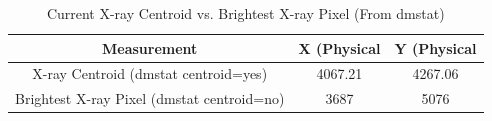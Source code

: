 \documentclass[a4paper,12pt]{article}
\begin{document}
\begin{table}[h]
    \centering
    \caption{Current X-ray Centroid vs. Brightest X-ray Pixel (From dmstat)}
    \begin{tabular}{|c|c|c|}
        \toprule
         \textbf{Measurement} & \textbf{X (Physical} & \textbf{Y (Physical}\\
         \midrule
         X-ray Centroid (dmstat centroid=yes) & 4067.21 & 4267.06 \\
         \midrule
         Brightest X-ray Pixel (dmstat centroid=no) & 3687 & 5076\\
         \bottomrule
    \end{tabular}
    \label{tab:Centroid comparision for A2163}
\end{table}
\end{document}
